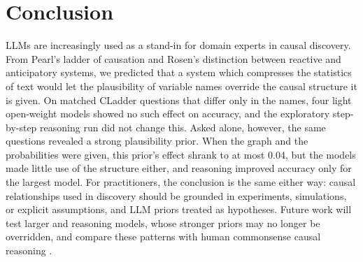 \documentclass{llncs}
\begin{document}
\section{Conclusion}
\label{sec:conclusion}

LLMs are increasingly used as a stand-in for domain experts in causal discovery. From Pearl's ladder of causation and Rosen's distinction between reactive and anticipatory systems, we predicted that a system which compresses the statistics of text would let the plausibility of variable names override the causal structure it is given. On matched CLadder questions that differ only in the names, four light open-weight models showed no such effect on accuracy, and the exploratory step-by-step reasoning run did not change this. Asked alone, however, the same questions revealed a strong plausibility prior. When the graph and the probabilities were given, this prior's effect shrank to at most 0.04, but the models made little use of the structure either, and reasoning improved accuracy only for the largest model. For practitioners, the conclusion is the same either way: causal relationships used in discovery should be grounded in experiments, simulations, or explicit assumptions, and LLM priors treated as hypotheses. Future work will test larger and reasoning models, whose stronger priors may no longer be overridden, and compare these patterns with human commonsense causal reasoning \cite{penn2007causal}.

%
%


\end{document}
